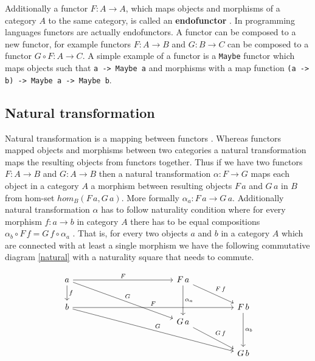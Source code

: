 \documentclass[article]{aaltoseries}
\begin{document}
    Additionally a functor $F: A \rightarrow A$, which maps objects and
    morphisms of a category $A$ to the same category, is called an
    \textbf{endofunctor} \cite{computational, barr1990category}. In programming
    languages functors are actually endofunctors. A functor can be composed to a
    new functor, for example functors $F: A \rightarrow B$ and $G: B \rightarrow
    C$ can be composed to a functor $G \circ F: A \rightarrow C$. A simple
    example of a functor is a \lstinline|Maybe| functor which maps objects such
    that \lstinline|a -> Maybe a| and morphisms with a map function
    \lstinline|(a -> b) -> Maybe a -> Maybe b|.


  \subsection{Natural transformation}
    Natural transformation is a mapping between functors \cite{computational,
      barr1990category, mac2013categories}. Whereas functors mapped objects and
    morphisms between two categories a natural transformation maps the resulting
    objects from functors together. Thus if we have two functors $F: A
    \rightarrow B$ and $G: A \rightarrow B$ then a natural transformation
    $\alpha: F \rightarrow G$ maps each object in a category $A$ a morphism
    between resulting objects $F\, a$ and $G\, a$ in $B$ from hom-set $hom_B(F\, a,
    G\, a)$. More formally $\alpha_a: F\, a \rightarrow G\, a$. Additionally
    natural transformation $\alpha$ has to follow naturality condition where for
    every morphism $f: a \rightarrow b$ in category $A$ there has to be equal
    compositions $\alpha_b \circ F\, f = G\, f \circ \alpha_a$
    \cite{barr1990category, computational, eilenberg1945general}. That is, for
    every two objects $a$ and $b$ in a category $A$ which are connected with at
    least a single morphism we have the following commutative diagram
    \ref{natural} with a naturality square that needs to commute.
    
    \begin{equation}
      \label{natural}
      \begin{tikzcd}[column sep=huge]
        a \arrow[r, "F"] \arrow[d, "f"] \arrow[ddr, "G"]
        &[7em] F\, a \arrow[dd, "\alpha_a"] \arrow[dr, "F\, f"]
        & \\
        b \arrow[rr, "F"] \arrow[ddrr, "G"]
        &
        & F\, b \arrow[dd, "\alpha_b"] \\
        [-1.5em]
        & G\, a \arrow[dr, "G\, f"]
        & \\
        [0.5em]
        &
        & G\, b \\
      \end{tikzcd}
    \end{equation}
\end{document}

